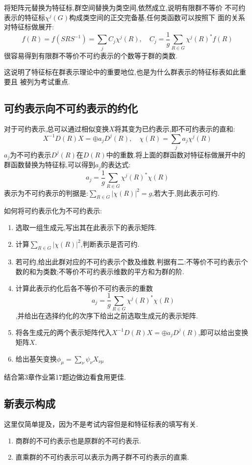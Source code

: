 \documentclass{ctexart}
\begin{document}
\noindent 将矩阵元替换为特征标,群空间替换为类空间,依然成立,说明有限群不等价
不可约表示的特征标$\chi^{j}(G)$构成类空间的正交完备基,任何类函数可以按照下
面的关系对特征标做展开:
\[
f(R)=f(SRS^{-1})=\sum_{j}C_{j}\chi^{j}(R),\quad C_{j}=\frac{1}{g}\sum_{R\in G}\chi^{j}(R)^{*}f(R)
\]
很容易得到有限群不等价不可约表示的个数等于群的类数.

这说明了特征标在群表示理论中的重要地位,也是为什么群表示的特征标表如此重要且
被列为考试重点.

\subsection{可约表示向不可约表示的约化}

对于可约表示,总可以通过相似变换$X$将其变为已约表示,即不可约表示的直和:
\[
X^{-1}D(R)X=\oplus a_{j}D^{j}(R), \quad \chi(R)=\sum_{j}a_{j}\chi^{j}(R)
\]
$a_{j}$为不可约表示$D^{j}(R)$在$D(R)$中的重数.将上面的群函数对特征标做展开中的群函数替换为特征标,可以得到$a_{j}$的表达式:
\[
a_{j}=\frac{1}{g}\sum_{R\in G} \chi^{j}(R)^{*}\chi(R)
\]
表示为不可约表示的判据是:$\sum_{R\in G}\left|\chi(R)\right|^{2}=g$,若大于,则此表示可约.\medskip

如何将可约表示化为不可约表示:
\begin{enumerate}
    \item 选取一组生成元,写出其在此表示下的表示矩阵.
    \item 计算$\sum_{R\in G}\left|\chi(R)\right|^{2}$,判断表示是否可约.
    \item 若可约,给出此群对应的不可约表示个数及维数.判据有二:不等价不可约表示个数的和为类数;不等价不可约表示维数的平方和为群的阶.
    \item 计算此表示约化后各不等价不可约表示的重数\[a_{j}=\frac{1}{g}\sum_{R\in G} \chi^{j}(R)^{*}\chi(R)\],并给出在选择约化的次序下给出之前选取生成元的表示矩阵.
    \item 将各生成元的两个表示矩阵代入$X^{-1}D(R)X=\oplus a_{j}D^{j}(R)$,即可以给出变换矩阵$X$.
    \item 给出基矢变换$\phi_{\mu}=\sum_{\nu}\psi_{\nu}X_{\nu\mu}$
\end{enumerate}

结合第3章作业第17题边做边看食用更佳.

\subsection{新表示构成}
这里仅简单提及，因为不是考试内容但是和特征标表的填写有关.

\begin{enumerate}
    \item 商群的不可约表示也是原群的不可约表示.
    \item 直乘群的不可约表示可以表示为两子群不可约表示的直乘.
\end{enumerate}
\end{document}
